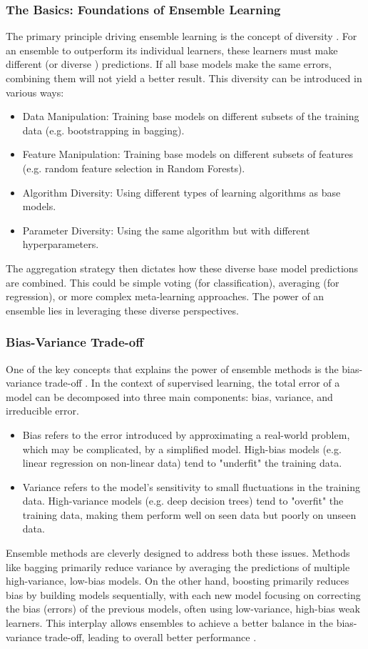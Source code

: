 \subsubsection{The Basics: Foundations of Ensemble Learning} 
The primary principle driving ensemble learning is the concept of diversity . For an ensemble to outperform its individual learners, these learners must make different (or diverse ) predictions. If all base models make the same errors, combining them will not yield a better result. This diversity can be introduced in various ways:
\begin{itemize}[noitemsep] 
\item Data Manipulation: Training base models on different subsets of the training data (e.g. bootstrapping in bagging). 
\item Feature Manipulation: Training base models on different subsets of features (e.g. random feature selection in Random Forests). 
\item Algorithm Diversity: Using different types of learning algorithms as base models.
\item Parameter Diversity: Using the same algorithm but with different hyperparameters.
\end{itemize} 
The aggregation strategy then dictates how these diverse base model predictions are combined. This could be simple voting (for classification), averaging (for regression), or more complex meta-learning approaches. The power of an ensemble lies in leveraging these diverse perspectives.

\subsubsection{Bias-Variance Trade-off} 
One of the key concepts that explains the power of ensemble methods is the bias-variance trade-off . In the context of supervised learning, the total error of a model can be decomposed into three main components: bias, variance, and irreducible error. 
\begin{itemize}[noitemsep] 
\item Bias refers to the error introduced by approximating a real-world problem, which may be complicated, by a simplified model. High-bias models (e.g. linear regression on non-linear data) tend to "underfit" the training data.
\item Variance refers to the model's sensitivity to small fluctuations in the training data. High-variance models (e.g. deep decision trees) tend to "overfit" the training data, making them perform well on seen data but poorly on unseen data.
\end{itemize} 
Ensemble methods are cleverly designed to address both these issues. Methods like bagging primarily reduce variance by averaging the predictions of multiple high-variance, low-bias models. On the other hand, boosting primarily reduces bias by building models sequentially, with each new model focusing on correcting the bias (errors) of the previous models, often using low-variance, high-bias weak learners. This interplay allows ensembles to achieve a better balance in the bias-variance trade-off, leading to overall better performance \parencite{zou2021survey}.


